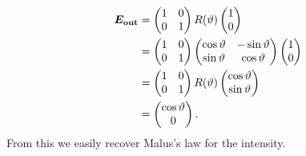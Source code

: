     \begin{align*}
        \bm{E_{\mathrm{out}}} &= 
        \begin{pmatrix}
            1 & 0\\
            0 & 1
        \end{pmatrix}
        R(\vartheta)
        \begin{pmatrix}
            1\\ 0
        \end{pmatrix}
        \\
        &= 
        \begin{pmatrix}
            1 & 0\\
            0 & 1
        \end{pmatrix}
        \begin{pmatrix}
            \cos\vartheta & -\sin\vartheta\\
            \sin\vartheta & \cos\vartheta
        \end{pmatrix}
        \begin{pmatrix}
            1\\ 0
        \end{pmatrix}
        \\
        &= 
        \begin{pmatrix}
            1 & 0\\
            0 & 1
        \end{pmatrix}
        R(\vartheta)
        \begin{pmatrix}
            \cos\vartheta\\ \sin\vartheta
        \end{pmatrix}
        \\
        &=
        \begin{pmatrix}
            \cos\vartheta\\ 0
        \end{pmatrix}
        .
    \end{align*}
    From this we easily recover Malus's law for the intensity.
    
